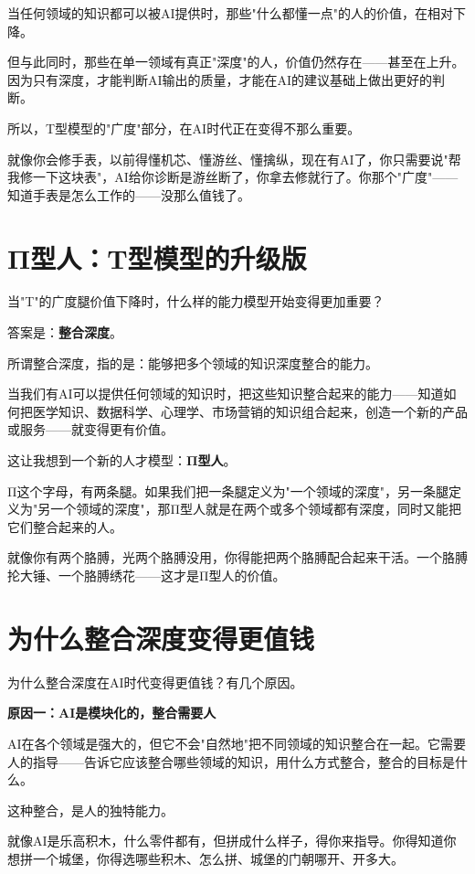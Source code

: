 当任何领域的知识都可以被AI提供时，那些"什么都懂一点"的人的价值，在相对下降。

但与此同时，那些在单一领域有真正"深度"的人，价值仍然存在——甚至在上升。因为只有深度，才能判断AI输出的质量，才能在AI的建议基础上做出更好的判断。

所以，T型模型的"广度"部分，在AI时代正在变得不那么重要。

就像你会修手表，以前得懂机芯、懂游丝、懂擒纵，现在有AI了，你只需要说"帮我修一下这块表"，AI给你诊断是游丝断了，你拿去修就行了。你那个"广度"——知道手表是怎么工作的——没那么值钱了。

\section{Π型人：T型模型的升级版}


当"T"的广度腿价值下降时，什么样的能力模型开始变得更加重要？

答案是：\textbf{整合深度}。

所谓整合深度，指的是：能够把多个领域的知识深度整合的能力。

当我们有AI可以提供任何领域的知识时，把这些知识整合起来的能力——知道如何把医学知识、数据科学、心理学、市场营销的知识组合起来，创造一个新的产品或服务——就变得更有价值。

这让我想到一个新的人才模型：\textbf{Π型人}。

Π这个字母，有两条腿。如果我们把一条腿定义为"一个领域的深度"，另一条腿定义为"另一个领域的深度"，那Π型人就是在两个或多个领域都有深度，同时又能把它们整合起来的人。

就像你有两个胳膊，光两个胳膊没用，你得能把两个胳膊配合起来干活。一个胳膊抡大锤、一个胳膊绣花——这才是Π型人的价值。

\section{为什么整合深度变得更值钱}


为什么整合深度在AI时代变得更值钱？有几个原因。

\textbf{原因一：AI是模块化的，整合需要人}

AI在各个领域是强大的，但它不会"自然地"把不同领域的知识整合在一起。它需要人的指导——告诉它应该整合哪些领域的知识，用什么方式整合，整合的目标是什么。

这种整合，是人的独特能力。

就像AI是乐高积木，什么零件都有，但拼成什么样子，得你来指导。你得知道你想拼一个城堡，你得选哪些积木、怎么拼、城堡的门朝哪开、开多大。

